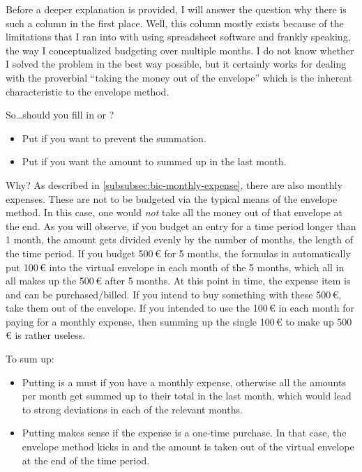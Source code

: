 Before a deeper explanation is provided, I will answer the question why there is such a column in the first place.
Well, this column mostly exists because of the limitations that I ran into with using spreadsheet software and frankly speaking, the way I conceptualized budgeting over multiple months.
I do not know whether I solved the problem in the best way possible, but it certainly works for dealing with the proverbial ``taking the money out of the envelope'' which is the inherent characteristic to the envelope method.

So\ldots should you fill in  or ?
\begin{itemize}
	\item Put  if you want to prevent the summation.
	\item Put  if you want the amount to summed up in the last month.
\end{itemize}

Why?
As described in \autoref{subsubsec:bic-monthly-expense}, there are also monthly expenses.
These are not to be budgeted via the typical means of the envelope method.
In this case, one would \emph{not} take all the money out of that envelope at the end.
As you will observe, if you budget an entry for a time period longer than 1 month, the amount gets divided evenly by the number of months, \ie the length of the time period.
If you budget 500\,€ for 5 months, the formulas in \tfn automatically put 100\,€ into the virtual envelope in each month of the 5 months, which all in all makes up the 500\,€ after 5 months.
At this point in time, the expense item is  and can be purchased/billed.
If you intend to buy something with these 500\,€, take them out of the envelope.
If you intended to use the 100\,€ in each month for paying for a monthly expense, then summing up the single 100\,€ to make up 500\,€ is rather useless.

To sum up:
\begin{itemize}
	\item Putting  is a must if you have a monthly expense, otherwise all the amounts per month get summed up to their total in the last month, which would lead to strong deviations in each of the relevant months.
	\item Putting  makes sense if the expense is a one-time purchase.
	In that case, the envelope method kicks in and the amount is taken out of the virtual envelope at the end of the time period.
\end{itemize}

